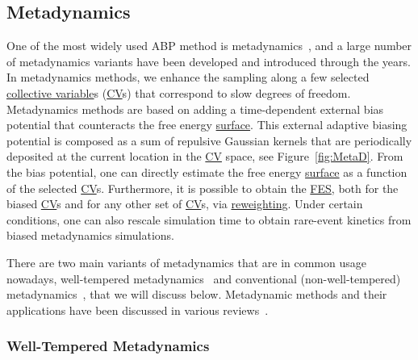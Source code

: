 \documentclass[9pt,review]{livecoms}
\begin{document}
\subsection{Metadynamics}
One of the most widely used ABP method is metadynamics~\cite{Laio-PNAS-2002,Barducci-PRL-2008,Valsson2016_ARPC_MetaD}, and a large number of metadynamics variants have been developed and introduced through the years. In metadynamics methods, we enhance the sampling along a few selected \hyperlink{ref:CV} {collective variable}s (\hyperlink{ref:CV} {CV}s) that correspond to slow degrees of freedom. Metadynamics methods are based on adding a time-dependent external bias potential that counteracts the free energy \hyperlink{ref:FES} {surface}. This external adaptive biasing potential is composed as a sum of repulsive Gaussian kernels that are periodically deposited at the current location in the \hyperlink{ref:CV} {CV} space, see Figure~\ref{fig:MetaD}. From the bias potential, one can directly estimate the free energy \hyperlink{ref:FES} {surface} as a function of the selected \hyperlink{ref:CV} {CV}s. Furthermore, it is possible to obtain the \hyperlink{ref:FES} {FES}, both for the biased \hyperlink{ref:CV} {CV}s and for any other set of \hyperlink{ref:CV} {CV}s, via \hyperlink{ref:Reweighting} {reweighting}. Under certain conditions, one can also rescale simulation time to obtain rare-event kinetics from biased metadynamics simulations.

There are two main variants of metadynamics that are in common usage nowadays, well-tempered metadynamics~\cite{Barducci-PRL-2008} and conventional (non-well-tempered) metadynamics~\cite{Laio-PNAS-2002}, that we will discuss below. Metadynamic methods and their applications have been discussed in various reviews~\cite{Barducci-WIREsCMS-2011,10.1080/08927022.2014.923574,10.1107/s2052252514027626,Valsson2016_ARPC_MetaD,10.1007/978-1-4939-9608-7_8,Bussi2020,BussiLaio_ReviewMetaD_2020}.

\subsubsection{Well-Tempered Metadynamics}
\end{document}
